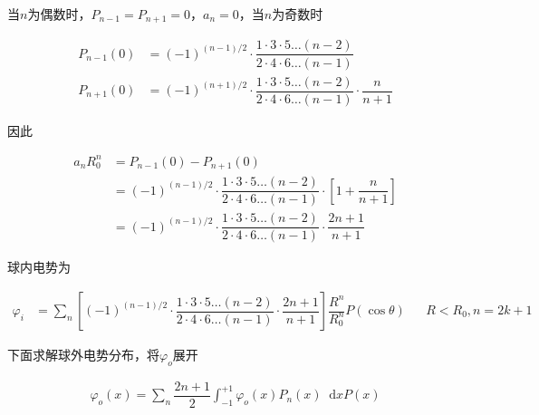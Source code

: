 \documentclass{article}
\newcommand*{\md}{\mathop{}\!\mathrm{d}}
\begin{document}
当$n$为偶数时，$P_{n-1}=P_{n+1}=0$，$a_n=0$，当$n$为奇数时

\begin{equation*}
  \begin{aligned}
    P_{n-1} \left( 0 \right) &= \left( -1  \right)^{\left( n-1 \right)/ 2} \cdot \dfrac{1 \cdot 3 \cdot 5 \dots \left( n-2 \right)}{2 \cdot 4 \cdot 6 \dots \left( n-1 \right)}  \\
    P_{n+1} \left( 0 \right) &= \left( -1  \right)^{\left( n+1 \right)/ 2} \cdot \dfrac{1 \cdot 3 \cdot 5 \dots \left( n-2 \right)}{2 \cdot 4 \cdot 6 \dots \left( n-1 \right)} \cdot \dfrac{n}{n+1}   
  \end{aligned}
\end{equation*}

因此

\begin{equation*}
  \begin{aligned}
    a_n R_0^n &=
    P_{n-1} \left( 0 \right) - P_{n+1} \left( 0 \right) \\
    &= \left( -1  \right)^{\left( n-1 \right)/ 2} \cdot \dfrac{1 \cdot 3 \cdot 5 \dots \left( n-2 \right)}{2 \cdot 4 \cdot 6 \dots \left( n-1 \right)} \cdot \left[ 1 + \dfrac{n}{n+1}  \right] \\
    &= \left( -1  \right)^{\left( n-1 \right)/ 2} \cdot \dfrac{1 \cdot 3 \cdot 5 \dots \left( n-2 \right)}{2 \cdot 4 \cdot 6 \dots \left( n-1 \right)} \cdot \dfrac{2n+1}{n+1}
  \end{aligned}
\end{equation*}

球内电势为

\begin{equation*}
  \begin{aligned}
    \varphi_i &= \sum_n \left[ \left( -1  \right)^{\left( n-1 \right)/ 2} \cdot \dfrac{1 \cdot 3 \cdot 5 \dots \left( n-2 \right)}{2 \cdot 4 \cdot 6 \dots \left( n-1 \right)} \cdot \dfrac{2n+1}{n+1}
 \right] \dfrac{R^n}{R_0^n}  P \left( \cos \theta \right) && R<R_0, n=2k+1
  \end{aligned}
\end{equation*}

下面求解球外电势分布，将$\varphi_o$展开

\begin{equation*}
  \begin{aligned}
    \varphi_o \left( x \right) = \sum_n \dfrac{2n+1}{2} \int_{-1}^{+1} \varphi_o \left( x \right) P_n \left( x \right) \md x P \left( x \right) 
  \end{aligned}
\end{equation*}
\end{document}

